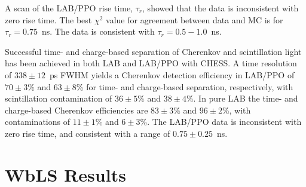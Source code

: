 A scan of the LAB/PPO rise time, $\tau_r$, showed that the data is inconsistent with zero rise time.  The best $\chi^2$ value for  agreement between data and MC is for $\tau_r=0.75$~ns. The data is consistent with $\tau_r=0.5-1.0$~ns.


Successful  time- and charge-based separation of Cherenkov and scintillation light has been achieved in both LAB and LAB/PPO with CHESS. 
A time resolution of $338\pm12$~ps FWHM yields a Cherenkov detection efficiency in LAB/PPO of  
$70 \pm 3 \%$ and $63\pm8$\% for time- and charge-based separation, respectively, with scintillation contamination of  $36\pm5\%$ and $38\pm4$\%.  In pure LAB the time- and charge-based Cherenkov efficiencies are $83\pm3\%$ and $96\pm2$\%, with contaminations of $11\pm1\%$ and $6\pm3$\%.
The LAB/PPO  data  is  inconsistent with zero rise time, and consistent with a range of $0.75\pm0.25$~ns.  


\section{WbLS Results}

